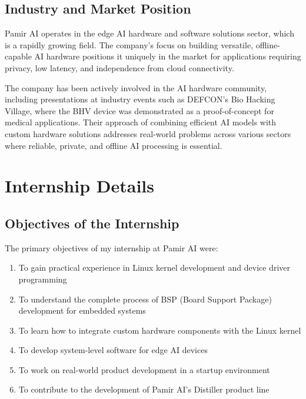 \documentclass[12pt,a4paper]{report}
\begin{document}


\section{Industry and Market Position}

Pamir AI operates in the edge AI hardware and software solutions sector, which is a rapidly growing field. The company's focus on building versatile, offline-capable AI hardware positions it uniquely in the market for applications requiring privacy, low latency, and independence from cloud connectivity.

\vspace{0.3cm}

The company has been actively involved in the AI hardware community, including presentations at industry events such as DEFCON's Bio Hacking Village, where the BHV device was demonstrated as a proof-of-concept for medical applications. Their approach of combining efficient AI models with custom hardware solutions addresses real-world problems across various sectors where reliable, private, and offline AI processing is essential.

\chapter{Internship Details}

\section{Objectives of the Internship}

The primary objectives of my internship at Pamir AI were:

\begin{enumerate}[itemsep=0.3cm]
    \item To gain practical experience in Linux kernel development and device driver programming
    \item To understand the complete process of BSP (Board Support Package) development for embedded systems
    \item To learn how to integrate custom hardware components with the Linux kernel
    \item To develop system-level software for edge AI devices
    \item To work on real-world product development in a startup environment
    \item To contribute to the development of Pamir AI's Distiller product line
\end{enumerate}
\end{document}
